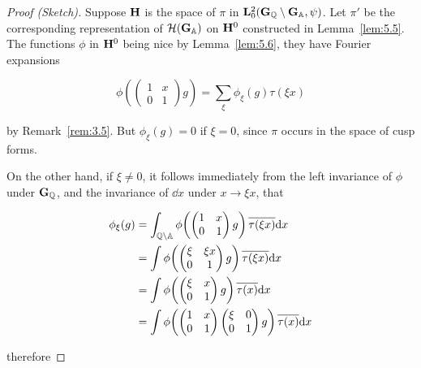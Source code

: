 \begin{proof}[Proof (Sketch)]

Suppose $\mathbf{H}$ is the space of $\pi$ in $\mathbf{L}_0^2(\mathbf{G}_{\mathbb{Q}} \setminus \mathbf{G}_{\mathbb{A}}, \psi)$. Let $\pi'$ be the corresponding representation of $\mathcal{H}(\mathbf{G}_{\mathbb{A}})$ on $\mathbf{H}^0$ constructed in Lemma~\ref{lem:5.5}. The functions $\phi$ in $\mathbf{H}^0$ being nice by Lemma~\ref{lem:5.6}, they have Fourier expansions

\begin{equation}\label{eq:5.6}
\phi\!\left(\begin{pmatrix} 1 & x \\ 0 & 1 \end{pmatrix} g\right) = \sum_{\xi} \phi_{\xi}(g) \tau(\xi x)\tag{5.6}
\end{equation}

by Remark~\ref{rem:3.5}. But $\phi_{\xi}(g) = 0$ if $\xi = 0$, since $\pi$ occurs in the space of cusp forms.

On the other hand, if $\xi \neq 0$, it follows immediately from the left invariance of $\phi$ under $\mathbf{G}_{\mathbb{Q}}$, and the invariance of $\dd x$ under $x \to \xi x$, that

\[
\begin{aligned}
\phi_{\xi}(g) &= \int_{\mathbb{Q} \setminus \mathbb{A}} \phi\!\left(\begin{pmatrix} 1 & x \\ 0 & 1 \end{pmatrix} g\right) \overline{\tau(\xi x)} \mathrm{d} x\\
&= \int \phi\!\left(\begin{pmatrix} \xi & \xi x \\ 0 & 1 \end{pmatrix} g\right) \overline{\tau(\xi x)} \mathrm{d} x\\
&= \int \phi\!\left(\begin{pmatrix} \xi & x \\ 0 & 1 \end{pmatrix} g\right) \overline{\tau(x)} \mathrm{d} x\\
&= \int \phi\!\left(\begin{pmatrix} 1 & x \\ 0 & 1 \end{pmatrix} \begin{pmatrix} \xi & 0 \\ 0 & 1 \end{pmatrix} g\right) \overline{\tau(x)} \mathrm{d} x
\end{aligned}
\]

therefore


\end{proof}

